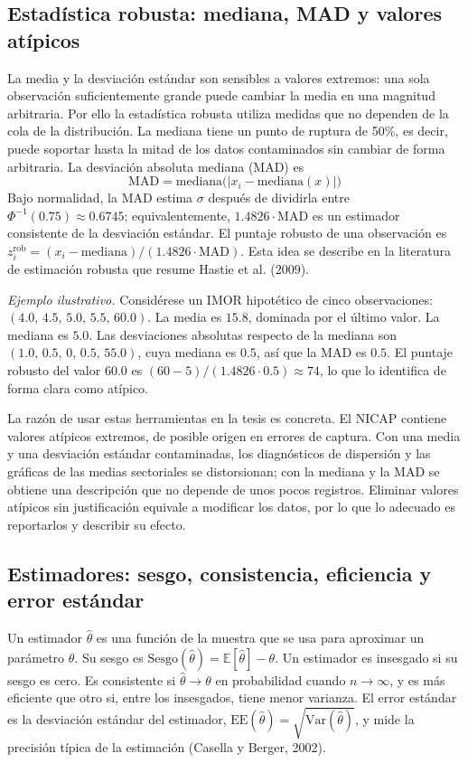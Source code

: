 \subsection{Estadística robusta: mediana, MAD y valores atípicos}
La media y la desviación estándar son sensibles a valores extremos: una sola observación suficientemente grande puede cambiar la media en una magnitud arbitraria. Por ello la estadística robusta utiliza medidas que no dependen de la cola de la distribución. La mediana tiene un punto de ruptura de 50\%, es decir, puede soportar hasta la mitad de los datos contaminados sin cambiar de forma arbitraria. La desviación absoluta mediana (MAD) es
\begin{equation}
\text{MAD}=\text{mediana}\big(|x_i-\text{mediana}(x)|\big)
\label{eq:mad}
\end{equation}
Bajo normalidad, la MAD estima $\sigma$ después de dividirla entre $\Phi^{-1}(0.75)\approx 0.6745$; equivalentemente, $1.4826\cdot\text{MAD}$ es un estimador consistente de la desviación estándar. El puntaje robusto de una observación es $z_i^{\text{rob}}=(x_i-\text{mediana})/(1.4826\cdot\text{MAD})$. Esta idea se describe en la literatura de estimación robusta que resume Hastie et al. (2009).

\textit{Ejemplo ilustrativo.} Considérese un IMOR hipotético de cinco observaciones: $(4.0,\,4.5,\,5.0,\,5.5,\,60.0)$. La media es $15.8$, dominada por el último valor. La mediana es $5.0$. Las desviaciones absolutas respecto de la mediana son $(1.0,\,0.5,\,0,\,0.5,\,55.0)$, cuya mediana es $0.5$, así que la MAD es $0.5$. El puntaje robusto del valor $60.0$ es $(60-5)/(1.4826\cdot 0.5)\approx 74$, lo que lo identifica de forma clara como atípico.

La razón de usar estas herramientas en la tesis es concreta. El NICAP contiene valores atípicos extremos, de posible origen en errores de captura. Con una media y una desviación estándar contaminadas, los diagnósticos de dispersión y las gráficas de las medias sectoriales se distorsionan; con la mediana y la MAD se obtiene una descripción que no depende de unos pocos registros. Eliminar valores atípicos sin justificación equivale a modificar los datos, por lo que lo adecuado es reportarlos y describir su efecto.

\subsection{Estimadores: sesgo, consistencia, eficiencia y error estándar}
Un estimador $\hat{\theta}$ es una función de la muestra que se usa para aproximar un parámetro $\theta$. Su sesgo es $\text{Sesgo}(\hat{\theta})=\mathbb{E}[\hat{\theta}]-\theta$. Un estimador es insesgado si su sesgo es cero. Es consistente si $\hat{\theta}\to\theta$ en probabilidad cuando $n\to\infty$, y es más eficiente que otro si, entre los insesgados, tiene menor varianza. El error estándar es la desviación estándar del estimador, $\text{EE}(\hat{\theta})=\sqrt{\text{Var}(\hat{\theta})}$, y mide la precisión típica de la estimación (Casella y Berger, 2002).

